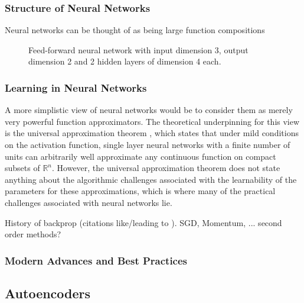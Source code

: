 \subsubsection{Structure of Neural Networks}

Neural networks can be thought of as being large function compositions

\begin{figure}[!htb]
  \centering
  \resizebox{\textwidth}{!}{\unskip}
  \caption{Feed-forward neural network with input dimension 3, output dimension 2 and 2 hidden layers of dimension 4 each.}
  \label{fig:ae}
\end{figure}

\newpage \phantom{x}
\newpage

\subsubsection{Learning in Neural Networks}

A more simplistic view of neural networks would be to consider them as merely very powerful function approximators. The theoretical underpinning for this view is the universal approximation theorem \cite{universal_approximation_theorem}, which states that under mild conditions on the activation function, single layer neural networks with a finite number of units can arbitrarily well approximate any continuous function on compact subsets of $\mathbb{R}^n$. However, the universal approximation theorem does not state anything about the algorithmic challenges associated with the learnability of the parameters for these approximations, which is where many of the practical challenges associated with neural networks lie.

History of backprop (citations like/leading to \cite{nature_backprop}). SGD, Momentum, ... second order methods?

\cite{nature_backprop, how_batch_norm_works, dropout}

\newpage \phantom{x}
\newpage

\subsubsection{Modern Advances and Best Practices}
\newpage \phantom{x}
\newpage

\subsection{Autoencoders}
\label{subsection:autoencoders}

